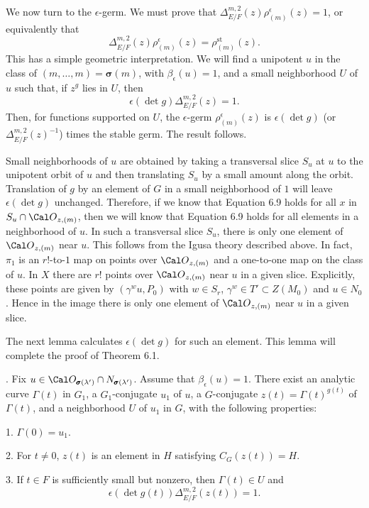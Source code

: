 We now turn to the $\epsilon$-germ.
We must prove that $\Delta^{m,2}_{E/F}(z)\rho^\epsilon_{(m)}(z) = 1$, or equivalently that
$$\Delta^{m,2}_{E/F}(z)\rho^\epsilon_{(m)}(z) = \rho^{\text{st}}_{(m)}(z).$$
This has a simple geometric interpretation.  We will find a unipotent $u$
in the class of $(m,\ldots,m)=\pmb\sigma(m)$, with $\beta_\epsilon(u) = 1$, and a small
neighborhood $U$ of $u$ such that, if $z^g$ lies in $U$, then
$$\epsilon(\det g)\Delta^{m,2}_{E/F}(z) = 1.\tag{6.9}$$
Then, for functions supported on $U$, the $\epsilon$-germ $\rho^\epsilon_{(m)}(z)$
is $\epsilon(\det g)$ (or $\Delta^{m,2}_{E/F}(z)^{-1}$) times the stable germ.
The result follows.

Small neighborhoods of $u$ are obtained by taking a transversal slice $S_u$
at $u$ to the unipotent orbit of $u$ and then translating $S_u$ by a small
amount along the orbit.
Translation of $g$ by an element of $G$ in a small neighborhood
of $1$ will leave $\epsilon(\det g)$ unchanged.
Therefore, if we know that Equation 6.9 holds for all $x$ in $S_u\cap {\Cal O}_{z,(m)}$,
then we will know that Equation 6.9 holds for all elements
in a neighborhood of $u$.  In such a transversal slice $S_u$, there is only
one element of ${\Cal O}_{z,(m)}$ near $u$.  This follows from the
Igusa theory described above.  In fact, $\pi_1$ is an $r!$-to-$1$ map on 
points over ${\Cal O}_{z,(m)}$
and a one-to-one map on the class of $u$.  In $X$ there are $r!$ points
 over ${\Cal O}_{z,(m)}$ near $u$
in a given slice.
Explicitly, these points are given by
$(\gamma^wu,P_0)$ with $w\in S_r$, $\gamma^w\in T'\subset Z(M_0)$ and $u\in N_0$.
Hence in the image there is only one element of ${\Cal O}_{z,(m)}$
near $u$ in a given slice.

The next lemma calculates $\epsilon(\det g)$ for such an element.  This lemma
will complete the proof of Theorem 6.1.


.  Fix $u\in {\Cal O_{\pmb\sigma(\lambda')}}\cap 
N_{\pmb\sigma(\lambda')}$.  Assume that $\beta_\epsilon(u) = 1$.
There exist an analytic curve $\Gamma(t)$ in $G_1$, a $G_1$-conjugate
$u_1$ of $u$, a $G$-conjugate $z(t)= \Gamma(t)^{g(t)}$ of $\Gamma(t)$, and a
neighborhood $U$ of $u_1$ in $G$,
with the following properties:
\item{1.}  $\Gamma(0) =u_1$.
\item{2.}  For $t\ne 0$, $z(t)$ is an element in $H$ satisfying
                  $C_G(z(t)) = H$.
\item{3.}  If $t\in F$ is sufficiently small but nonzero,
       then $\Gamma(t)\in U$ and 
       $$\epsilon(\det g(t))\Delta^{m,2}_{E/F}(z(t))=1.$$
\finishproclaim

